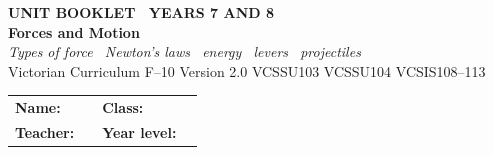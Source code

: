 \documentclass[11pt,a4paper]{article}
\begin{document}
\setlength{\parindent}{0pt}
\setlength{\parskip}{4pt}

\thispagestyle{plain}

\begin{tcolorbox}[
  enhanced, breakable=false, arc=4mm,
  colback=NavyBlue, colframe=NavyBlue,
  left=6mm, right=6mm, top=9mm, bottom=9mm,
  boxrule=0pt
]
  \begin{center}
    {\headingfont\bfseries\color{Sky}\footnotesize\MakeUppercase{Unit Booklet \textbullet\ Years 7 and 8}}\\[10pt]
    {\headingfont\bfseries\color{white}\fontsize{40}{44}\selectfont Forces and Motion}\\[8pt]
    {\large\color{white!85!NavyBlue}\itshape Types of force \textbullet\ Newton's laws \textbullet\ energy \textbullet\ levers \textbullet\ projectiles}\\[14pt]
    {\headingfont\color{white!72!NavyBlue}\normalsize Victorian Curriculum F--10 Version 2.0 \textbar{}
     VCSSU103 \textbar{} VCSSU104 \textbar{} VCSIS108--113}
  \end{center}
\end{tcolorbox}

\vspace{10pt}

\begin{tabular}{@{}p{3.5cm} p{6cm} p{2cm} p{3.5cm}@{}}
  \textbf{Name:}    & \underline{\hspace{5.8cm}} & \textbf{Class:}   & \underline{\hspace{3.3cm}} \\[8pt]
  \textbf{Teacher:} & \underline{\hspace{5.8cm}} & \textbf{Year level:} & \underline{\hspace{3.3cm}} \\
\end{tabular}

\vspace{10pt}
\end{document}
